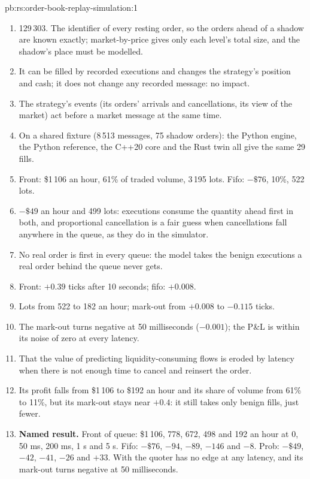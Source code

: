 \begin{solution}{pb:rs:order-book-replay-simulation:1}
\begin{enumerate}
\item 129\,303. The identifier of every resting order, so the orders ahead of a shadow are known exactly; market-by-price gives only each level's total size, and the
shadow's place must be modelled.
\item It can be filled by recorded executions and changes the strategy's position and cash; it does not change any recorded message: no impact.
\item The strategy's events (its orders' arrivals and cancellations, its view of the market) act before a market message at the same time.
\item On a shared fixture (8\,513 messages, 75 shadow orders): the Python engine, the Python reference, the C++20 core and the Rust twin all give the same 29 fills.
\item Front: \$1\,106 an hour, 61\% of traded volume, 3\,195 lots. Fifo: $-\$76$, 10\%, 522 lots.
\item $-\$49$ an hour and 499 lots: executions consume the quantity ahead first in both, and proportional cancellation is a fair guess when cancellations fall anywhere in
the queue, as they do in the simulator.
\item No real order is first in every queue: the model takes the benign executions a real order behind the queue never gets.
\item Front: $+0.39$ ticks after 10 seconds; fifo: $+0.008$.
\item Lots from 522 to 182 an hour; mark-out from $+0.008$ to $-0.115$ ticks.
\item The mark-out turns negative at 50 milliseconds ($-0.001$); the P\&L is within its noise of zero at every latency.
\item That the value of predicting liquidity-consuming flows is eroded by latency when there is not enough time to cancel and reinsert the order.
\item Its profit falls from \$1\,106 to \$192 an hour and its share of volume from 61\% to 11\%, but its mark-out stays near $+0.4$: it still takes only benign
fills, just fewer.
\item \textbf{Named result.} Front of queue: \$1\,106, 778, 672, 498 and 192 an hour at 0, 50 ms, 200 ms, 1 s and 5 s. Fifo: $-\$76$, $-94$, $-89$, $-146$ and
$-8$. Prob: $-\$49$, $-42$, $-41$, $-26$ and $+33$. With  the quoter has no edge at any latency, and its mark-out turns negative at 50 milliseconds.

\end{enumerate}
\end{solution}
